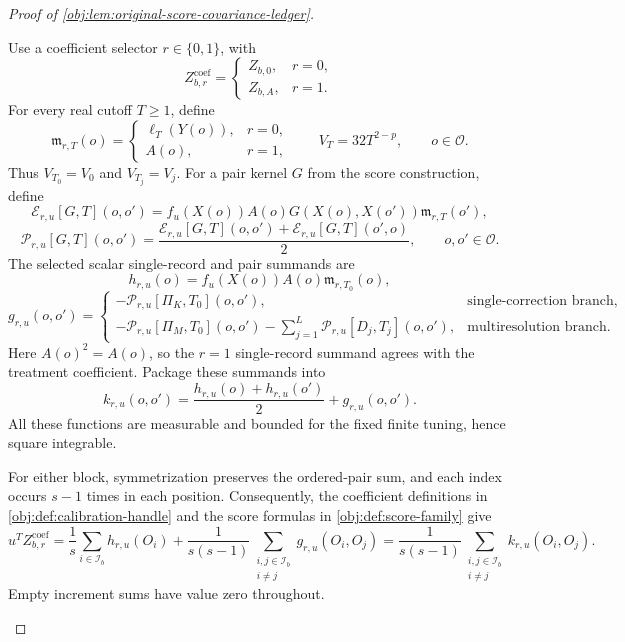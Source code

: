 \documentclass[11pt]{article}
\begin{document}
\begin{proof}[Proof of \cref{obj:lem:original-score-covariance-ledger}]
\begin{enumerate}
Use a coefficient selector \(r\in\{0,1\}\), with
\[
Z_{b,r}^{\mathrm{coef}}
=
\begin{cases}
Z_{b,0},&r=0,\\
Z_{b,A},&r=1.
\end{cases}
\]
For every real cutoff \(T\ge1\), define
\[
\mathfrak m_{r,T}(o)
=
\begin{cases}
\ell_T(Y(o)),&r=0,\\
A(o),&r=1,
\end{cases}
\qquad
V_T=32T^{2-p},
\qquad o\in\mathcal O.
\]
Thus \(V_{T_0}=V_0\) and \(V_{T_j}=V_j\). For a pair kernel \(G\) from the score construction, define
\[
\mathscr E_{r,u}[G,T](o,o')
=
f_u(X(o))A(o)G(X(o),X(o'))\mathfrak m_{r,T}(o'),
\]
\[
\mathscr P_{r,u}[G,T](o,o')
=
\frac{
\mathscr E_{r,u}[G,T](o,o')
+
\mathscr E_{r,u}[G,T](o',o)
}{2},
\qquad o,o'\in\mathcal O.
\]
The selected scalar single-record and pair summands are
\[
h_{r,u}(o)=f_u(X(o))A(o)\mathfrak m_{r,T_0}(o),
\]
\[
g_{r,u}(o,o')
=
\begin{cases}
-\mathscr P_{r,u}[\Pi_K,T_0](o,o'),
&\text{single-correction branch},\\[1mm]
-\mathscr P_{r,u}[\Pi_M,T_0](o,o')
-\displaystyle\sum_{j=1}^{L}\mathscr P_{r,u}[D_j,T_j](o,o'),
&\text{multiresolution branch}.
\end{cases}
\]
Here \(A(o)^2=A(o)\), so the \(r=1\) single-record summand agrees with the treatment coefficient. Package these summands into
\[
k_{r,u}(o,o')
=
\frac{h_{r,u}(o)+h_{r,u}(o')}{2}
+
g_{r,u}(o,o').
\]
All these functions are measurable and bounded for the fixed finite tuning, hence square integrable.

For either block, symmetrization preserves the ordered-pair sum, and each index occurs \(s-1\) times in each position. Consequently, the coefficient definitions in \cref{obj:def:calibration-handle} and the score formulas in \cref{obj:def:score-family} give
\[
u^TZ_{b,r}^{\mathrm{coef}}
=
\frac1s\sum_{i\in\mathcal I_b}h_{r,u}(O_i)
+
\frac1{s(s-1)}
\sum_{\substack{i,j\in\mathcal I_b\\i\ne j}}
g_{r,u}(O_i,O_j)
=
\frac1{s(s-1)}
\sum_{\substack{i,j\in\mathcal I_b\\i\ne j}}
k_{r,u}(O_i,O_j).
\]
Empty increment sums have value zero throughout.


\end{enumerate}
\end{proof}
\end{document}
